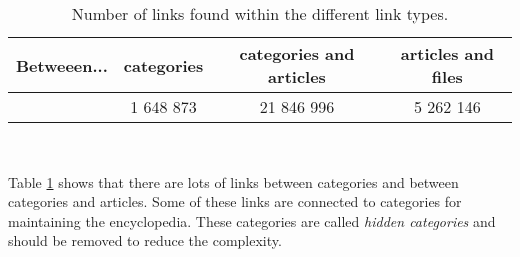 \begin{table}[ht]
\renewcommand{\arraystretch}{1.25}
\begin{tabularx}{\textwidth}{l|c|c|c} %
\textbf{Betweeen...} & \textbf{categories} &  \textbf{categories and articles} & \textbf{articles and files} \\\hline
 & 1 648 873 & 21 846 996 & 5 262 146
\end{tabularx}
\\[10pt]
\caption{Number of links found within the different link types.}
\label{tab:enwikicatlinks}
\end{table}



Table \ref{tab:enwikicatlinks} shows that there are lots of links between categories and between categories and articles. Some of these links are connected to categories for maintaining the encyclopedia. These categories are called \emph{hidden categories} and should be removed to reduce the complexity.
